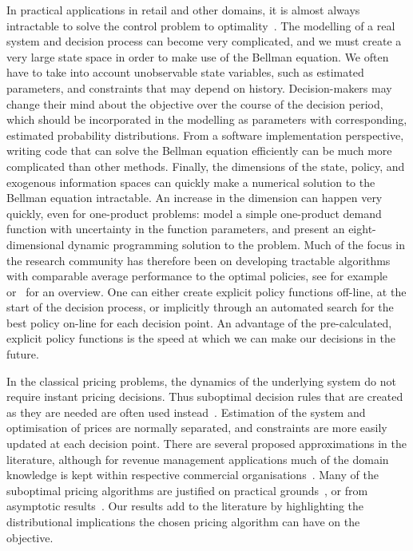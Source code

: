 \documentclass[main.tex]{subfiles}
\begin{document}
In practical applications in retail and other domains, it is almost always
intractable to solve the control problem to optimality~\citep{farmer2017uncertainty}.
The modelling of a real system and decision process can become very
complicated, and  we must  create a very
large state space in order to make use of the Bellman equation.
We often have to take into account unobservable
state variables, such as estimated parameters, and constraints
that may depend on history. Decision-makers may change their mind
about the objective over the course of the decision period, which should
be incorporated in the modelling as parameters with corresponding, estimated
probability distributions.
From a software implementation perspective, writing code that can
solve the Bellman equation efficiently can be much more complicated
than other methods.
Finally, the dimensions of the state, policy, and exogenous
information spaces can quickly make a numerical solution to the Bellman
equation intractable. An increase in the dimension can happen very
quickly, even for one-product problems:
\citet{bertsimas2001dynamic} model a simple
one-product demand function with uncertainty in the function
parameters, and present an eight-dimensional dynamic programming
solution to the problem.
Much of the focus in the research community has therefore been on
developing tractable algorithms with comparable average performance to the
optimal policies, see for
example~\citet{powell2011approximate} or~\citet{bertsekas2012dynamic}
for an overview.
One can either create explicit policy functions off-line, at the
start of the decision process, or implicitly through an automated
search for the best policy on-line for each decision point.
An advantage of the pre-calculated, explicit policy functions
is the speed at which we can make our decisions in the
future.

In the classical pricing problems, the dynamics of the
underlying system do not require instant pricing decisions. Thus
suboptimal decision rules that are created as they are needed are often used
instead~\citep{talluri2006theory}. Estimation of the system and optimisation of prices are
normally separated, and constraints are more easily updated at each
decision point.
There are several proposed approximations in the
literature, although for revenue management applications much of the domain knowledge is kept within
respective commercial organisations~\citep[Ch.~9]{talluri2006theory}.
Many of the suboptimal pricing algorithms are justified on practical
grounds~\citep{aviv2012dynamic}, or
from asymptotic results~\citep{gallego1994optimal}.
Our results add to the literature by highlighting the
distributional implications the chosen pricing algorithm can have on
the objective.
\end{document}
